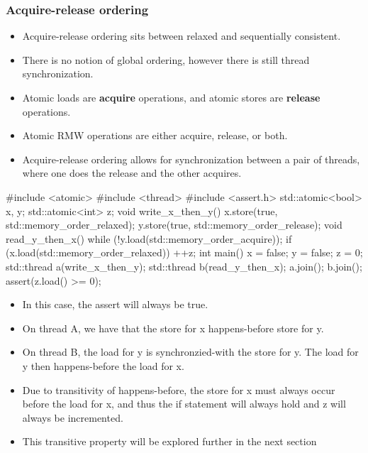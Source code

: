 \documentclass[11pt, a4paper]{article}
\theoremstyle{definition}
\theoremstyle{remark}
\begin{document}
\subsubsection{Acquire-release ordering}
\begin{itemize}
    \item Acquire-release ordering sits between relaxed and sequentially consistent.
    \item There is no notion of global ordering, however there is still thread synchronization.
    \item Atomic loads are \textbf{acquire} operations, and atomic stores are \textbf{release} operations.
    \item Atomic RMW operations are either acquire, release, or both.
    \item Acquire-release ordering allows for synchronization between a pair of threads, where one does the release and the other acquires.
\end{itemize}
\newpage
\begin{cppcode}
#include <atomic>
#include <thread>
#include <assert.h>
std::atomic<bool> x, y;
std::atomic<int> z;
void write_x_then_y() {
    x.store(true, std::memory_order_relaxed);
    y.store(true, std::memory_order_release);
}
void read_y_then_x() {
    while (!y.load(std::memory_order_acquire));
    if (x.load(std::memory_order_relaxed)) ++z;
}
int main() {
    x = false;
    y = false;
    z = 0;
    std::thread a(write_x_then_y);
    std::thread b(read_y_then_x);
    a.join();
    b.join();
    assert(z.load() >= 0);
}
\end{cppcode}
\begin{itemize}
    \item In this case, the assert will always be true.
    \item On thread A, we have that the store for x happens-before store for y.
    \item On thread B, the load for y is synchronzied-with the store for y. The load for y then happens-before the load for x.
    \item Due to transitivity of happens-before, the store for x must always occur before the load for x, and thus the if statement will always hold and z will always be incremented.
    \item This transitive property will be explored further in the next section
\end{itemize}
\end{document}

